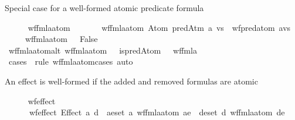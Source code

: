 \begin{isabellebody}
\endisatagproof
{\isafoldproof}%
%
\isadelimproof
%
\endisadelimproof
%
\begin{isamarkuptext}%
Special case for a well-formed atomic predicate formula%
\end{isamarkuptext}\isamarkuptrue%
\ \ \ \ \isamarkupfalse%
\ wf{\isacharunderscore}{\kern0pt}fmla{\isacharunderscore}{\kern0pt}atom\ \isanewline
\ \ \ \ \ \ {\isachardoublequoteopen}wf{\isacharunderscore}{\kern0pt}fmla{\isacharunderscore}{\kern0pt}atom\ {\isacharparenleft}{\kern0pt}Atom\ {\isacharparenleft}{\kern0pt}predAtm\ a\ vs{\isacharparenright}{\kern0pt}{\isacharparenright}{\kern0pt}\ {\isasymlongleftrightarrow}\ wf{\isacharunderscore}{\kern0pt}pred{\isacharunderscore}{\kern0pt}atom\ {\isacharparenleft}{\kern0pt}a{\isacharcomma}{\kern0pt}vs{\isacharparenright}{\kern0pt}{\isachardoublequoteclose}\isanewline
\ \ \ \ {\isacharbar}{\kern0pt}\ {\isachardoublequoteopen}wf{\isacharunderscore}{\kern0pt}fmla{\isacharunderscore}{\kern0pt}atom\ {\isacharunderscore}{\kern0pt}\ {\isasymlongleftrightarrow}\ False{\isachardoublequoteclose}\isanewline
\isanewline
\ \ \ \ \isamarkupfalse%
\ wf{\isacharunderscore}{\kern0pt}fmla{\isacharunderscore}{\kern0pt}atom{\isacharunderscore}{\kern0pt}alt{\isacharcolon}{\kern0pt}\ {\isachardoublequoteopen}wf{\isacharunderscore}{\kern0pt}fmla{\isacharunderscore}{\kern0pt}atom\ {\isasymphi}\ {\isasymlongleftrightarrow}\ is{\isacharunderscore}{\kern0pt}predAtom\ {\isasymphi}\ {\isasymand}\ wf{\isacharunderscore}{\kern0pt}fmla\ {\isasymphi}{\isachardoublequoteclose}\isanewline
%
\isadelimproof
\ \ \ \ \ \ %
\endisadelimproof
%
\isatagproof
{}\isamarkupfalse%
\ {\isacharparenleft}{\kern0pt}cases\ {\isasymphi}\ rule{\isacharcolon}{\kern0pt}\ wf{\isacharunderscore}{\kern0pt}fmla{\isacharunderscore}{\kern0pt}atom{\isachardot}{\kern0pt}cases{\isacharparenright}{\kern0pt}\ auto%
\endisatagproof
{\isafoldproof}%
%
\isadelimproof
%
\endisadelimproof
%
\begin{isamarkuptext}%
An effect is well-formed if the added and removed formulas
      are atomic%
\end{isamarkuptext}\isamarkuptrue%
\ \ \ \ \isamarkupfalse%
\ wf{\isacharunderscore}{\kern0pt}effect\ \isanewline
\ \ \ \ \ \ {\isachardoublequoteopen}wf{\isacharunderscore}{\kern0pt}effect\ {\isacharparenleft}{\kern0pt}Effect\ a\ d{\isacharparenright}{\kern0pt}\ {\isasymlongleftrightarrow}\ {\isacharparenleft}{\kern0pt}{\isasymforall}ae{\isasymin}set\ a{\isachardot}{\kern0pt}\ wf{\isacharunderscore}{\kern0pt}fmla{\isacharunderscore}{\kern0pt}atom\ ae{\isacharparenright}{\kern0pt}\ {\isasymand}\ {\isacharparenleft}{\kern0pt}{\isasymforall}de{\isasymin}set\ d{\isachardot}{\kern0pt}\ wf{\isacharunderscore}{\kern0pt}fmla{\isacharunderscore}{\kern0pt}atom\ de{\isacharparenright}{\kern0pt}{\isachardoublequoteclose}\isanewline

\end{isabellebody}
